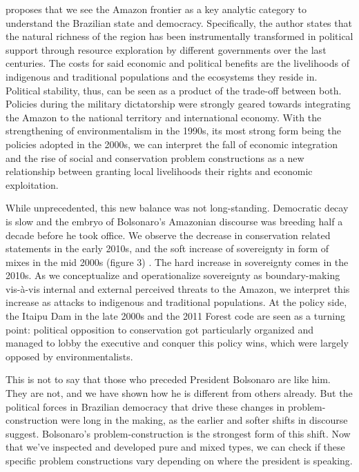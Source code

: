 \documentclass[]{interact}
\theoremstyle{plain}%
\theoremstyle{definition}
\theoremstyle{remark}
\begin{document}
\citet{pacheco2019} proposes that we see the Amazon frontier as a key
analytic category to understand the Brazilian state and democracy.
Specifically, the author states that the natural richness of the region
has been instrumentally transformed in political support through
resource exploration by different governments over the last centuries.
The costs for said economic and political benefits are the livelihoods
of indigenous and traditional populations and the ecosystems they reside
in. Political stability, thus, can be seen as a product of the trade-off
between both. Policies during the military dictatorship were strongly
geared towards integrating the Amazon to the national territory and
international economy. With the strengthening of environmentalism in the
1990s, its most strong form being the policies adopted in the 2000s, we
can interpret the fall of economic integration and the rise of social
and conservation problem constructions as a new relationship between
granting local livelihoods their rights and economic exploitation.

While unprecedented, this new balance was not long-standing. Democratic
decay is slow and the embryo of Bolsonaro's Amazonian discourse was
breeding half a decade before he took office. We observe the decrease in
conservation related statements in the early 2010s, and the soft
increase of sovereignty in form of mixes in the mid 2000s (figure 3) .
The hard increase in sovereignty comes in the 2010s. As we conceptualize
and operationalize sovereignty as boundary-making vis-à-vis internal and
external perceived threats to the Amazon, we interpret this increase as
attacks to indigenous and traditional populations. At the policy side,
the Itaipu Dam in the late 2000s and the 2011 Forest code are seen as a
turning point: political opposition to conservation got particularly
organized and managed to lobby the executive and conquer this policy
wins, which were largely opposed by environmentalists.

This is not to say that those who preceded President Bolsonaro are like
him. They are not, and we have shown how he is different from others
already. But the political forces in Brazilian democracy that drive
these changes in problem-construction were long in the making, as the
earlier and softer shifts in discourse suggest. Bolsonaro's
problem-construction is the strongest form of this shift. Now that we've
inspected and developed pure and mixed types, we can check if these
specific problem constructions vary depending on where the president is
speaking.
\end{document}
